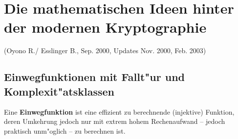 \setcounter{satz}{0}
\setcounter{definition}{0}

\newcommand{\NT}{\vspace*{0.2\baselineskip}\\}
\newcommand{\HZ}{\vspace*{0.5\baselineskip}}
\newcommand{\R}{\text{I}\!\text{R}}
\newcommand{\N}{\text{I}\!\text{N}}
\newcommand{\Q}{\text{Q}\!\!\!\text{l}\,\,}
\newcommand{\C}{\text{C}\!\!\!\text{l}\,\,}
\newcommand{\K}{\text{I}\!\text{K}}
\newcommand{\Z}{\mathbf{\mathbb{Z}}}
\newcommand{\fs}{\mathscr{F}}  
\newcommand{\es}{\mathscr{E}}  
\newcommand{\cs}{\mathscr{C}}  
\newcommand{\gs}{\mathscr{G}}
\newcommand{\is}{\mathscr{I}}
\newcommand{\os}{\mathscr{O}}
\newcommand{\ks}{\mathscr{K}}
\newcommand{\qs}{\mathscr{Q}}
\newcommand{\us}{\mathscr{U}}
\newcommand{\hs}{\mathscr{H}}
\newcommand{\ps}{\mathscr{P}}
\newcommand{\as}{\mathscr{A}}
\newcommand{\rs}{\mathscr{R}}
\newcommand{\bs}{\mathscr{B}}
\newcommand{\PG}{\text{I}\!\text{P}}
\newcommand{\carre}{\square}
\newcommand{\ncarre}{/\negthickspace\negthickspace\square}
\newcommand{\ncarreq}{{\ncarre}_q}
\newcommand{\ncarree}{/\negthickspace\negthickspace\negthickspace\square}
\newcommand{\ncarrepi}{{\ncarre}_{p^i}}
\newcommand{\mc}[1]{{\cal #1}}
\newcommand{\Char}{\text{char}}
\newcommand{\Aut}{\text{Aut}}
\newcommand{\Fix}{\text{Fix}}
\newcommand{\Syl}{\text{Syl}}
\newcommand{\Bild}{\text{Bild}}
\newcommand{\ggt}{\text{ggT}}
\newcommand{\kgv}{\text{kgV}}
\newcommand{\Id}{\text{Id}}
\newcommand{\nqcarre}{{\ncarre}_{q^2}}

\setlength{\fboxrule}{.4pt}
\setlength{\fboxsep}{4pt}

\newpage
\section{Die mathematischen Ideen hinter der modernen Kryptographie}
(Oyono R./ Esslinger B., Sep. 2000, Updates Nov. 2000, Feb. 2003)
       \subsection{Einwegfunktionen mit Fallt"ur und Komplexit"atsklassen}
 
Eine {\bf Einwegfunktion} \hypertarget{Einwegfunktionen1}{} ist eine effizient zu 
berechnende (injektive) Funktion, deren Umkehrung jedoch nur mit 
extrem hohem Rechenaufwand -- jedoch praktisch unm"oglich -- zu berechnen ist.\par

